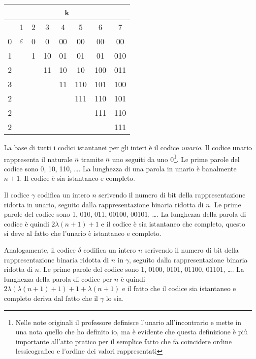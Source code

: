 \begin{table}[ht]
    \centering
    \begin{tabular}{|c||c|c|c|c|c|c|c|}
      \hline
      \multicolumn{8}{|c|}{k} \\
      \hline
       &1 &2 &3 &4 &5 &6  &7 \\
      \hline
      0 &$\varepsilon$ &0 &0 &00 &00 &00 &00 \\
      1 & &1 &10 &01 &01 &01 &010 \\
      2 & & &11 &10 &10 &100 &011 \\
      3 & & & &11 &110 &101 &100 \\
      2 & & & & &111 &110 &101 \\
      2 & & & & & &111 &110 \\
      2 & & & & & & &111 \\
      \hline
    \end{tabular}
\end{table}
\noindent La base di tutti i codici istantanei per gli interi è il codice \textit{unario}. Il codice unario rappresenta il naturale $n$ tramite $n$ uno seguiti da uno 0\footnote{Nelle note originali il professore definisce l'unario all'incontrario e mette in una nota quello che ho definito io, ma è evidente che questa definizione è più importante all'atto pratico per il semplice fatto che fa coincidere ordine lessicografico e l'ordine dei valori rappresentati}. Le prime parole del codice sono 0, 10, 110, \dots. La lunghezza di una parola in unario è banalmente $n + 1$. Il codice è sia istantaneo e completo.

Il codice $\gamma$ \cite{elias} codifica un intero $n$ scrivendo il numero di bit della rappresentazione ridotta in unario, seguito dalla rappresentazione binaria ridotta di $n$. Le prime parole del codice sono 1, 010, 011, 00100, 00101, \dots. La lunghezza della parola di codice è quindi $2\lambda(n + 1) + 1$ e il codice è sia istantaneo che completo, questo si deve al fatto che l'unario è istantaneo e completo.

Analogamente, il codice $\delta$ \cite{elias} codifica un intero $n$ scrivendo il numero di bit della rappresentazione binaria ridotta di $n$ in $\gamma$, seguito dalla rappresentazione binaria ridotta di $n$. Le prime parole del codice sono 1, 0100, 0101, 01100, 01101, \dots. La lunghezza della parola di codice per $n$ è quindi $2\lambda(\lambda(n + 1) + 1) + 1 + \lambda(n + 1)$ e il fatto che il codice sia istantaneo e completo deriva dal fatto che il $\gamma$ lo sia.

